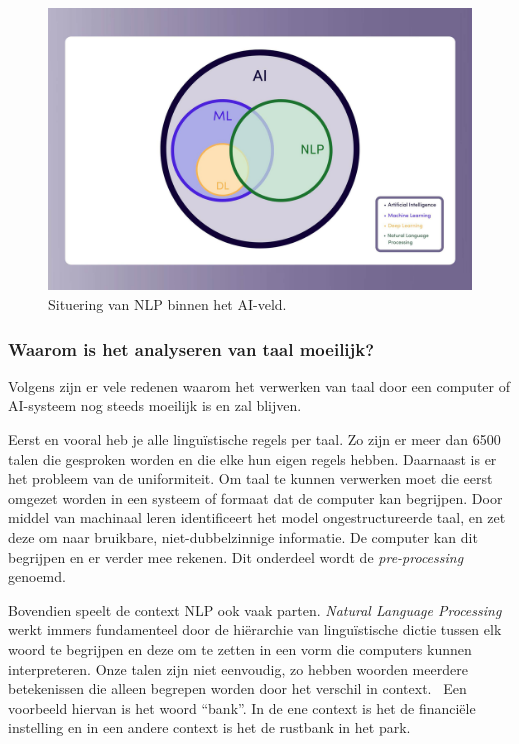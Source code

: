 \begin{figure}
    \centering
    \includegraphics[width=.8\textwidth]{./img/nlp_field_ai.jpeg}
    \caption{\label{fig:nlp_field} Situering van NLP binnen het AI-veld.~\autocite{Kleinings2022}}
\end{figure}

\subsubsection{Waarom is het analyseren van taal moeilijk?}
Volgens \textcite{Kleinings2022} zijn er vele redenen waarom het verwerken van taal door een computer of AI-systeem nog steeds moeilijk is en zal blijven.

Eerst en vooral heb je alle linguïstische regels per taal. Zo zijn er meer dan 6500 talen die gesproken worden en die elke hun eigen regels hebben.
Daarnaast is er het probleem van de uniformiteit. Om taal te kunnen verwerken moet die eerst omgezet worden in een systeem of formaat dat de computer kan begrijpen. Door middel van machinaal leren identificeert het model ongestructureerde taal, en zet deze om naar bruikbare, niet-dubbelzinnige informatie. De computer kan dit begrijpen en er verder mee rekenen. Dit onderdeel wordt de \textit{pre-processing} genoemd.

Bovendien speelt de context NLP ook vaak parten. \textit{Natural Language Processing} werkt immers fundamenteel door de hiërarchie van linguïstische dictie tussen elk woord te begrijpen en deze om te zetten in een vorm die computers kunnen interpreteren. Onze talen zijn niet eenvoudig, zo hebben woorden meerdere betekenissen die alleen begrepen worden door het verschil in context.~\autocite{Kleinings2022} Een voorbeeld hiervan is het woord ``bank''. In de ene context is het de financiële instelling en in een andere context is het de rustbank in het park.

